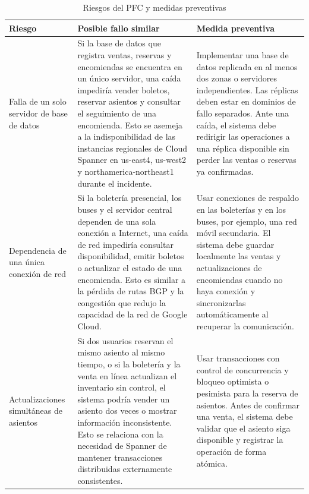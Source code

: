 \documentclass[11pt]{article}
\begin{document}
\begin{table}[H]
\centering
\caption{Riesgos del PFC y medidas preventivas}
\label{tab:riesgos}
\footnotesize
\begin{tabularx}{\textwidth}{p{2.8cm}Xp{4.8cm}}
\usepackage{float}
\hline
\textbf{Riesgo} & \textbf{Posible fallo similar} & \textbf{Medida preventiva} \\
\hline
Falla de un solo servidor de base de datos & Si la base de datos que registra ventas,
reservas y encomiendas se encuentra en un único servidor, una caída impediría vender boletos,
reservar asientos y consultar el seguimiento de una encomienda. Esto se asemeja a la
indisponibilidad de las instancias regionales de Cloud Spanner en us-east4, us-west2 y
northamerica-northeast1 durante el incidente. \cite{googlecloud19009} &
Implementar una base de datos replicada en al menos dos zonas o servidores independientes.
Las réplicas deben estar en dominios de fallo separados. Ante una caída, el sistema debe
redirigir las operaciones a una réplica disponible sin perder las ventas o reservas ya
confirmadas. \\
\hline
Dependencia de una única conexión de red & Si la boletería presencial, los buses y el
servidor central dependen de una sola conexión a Internet, una caída de red impediría
consultar disponibilidad, emitir boletos o actualizar el estado de una encomienda. Esto es
similar a la pérdida de rutas BGP y la congestión que redujo la capacidad de la red de Google
Cloud. \cite{googlecloud19009} &
Usar conexiones de respaldo en las boleterías y en los buses, por ejemplo, una red móvil
secundaria. El sistema debe guardar localmente las ventas y actualizaciones de encomiendas
cuando no haya conexión y sincronizarlas automáticamente al recuperar la comunicación. \\
\hline
Actualizaciones simultáneas de asientos & Si dos usuarios reservan el mismo asiento al mismo
tiempo, o si la boletería y la venta en línea actualizan el inventario sin control, el sistema
podría vender un asiento dos veces o mostrar información inconsistente. Esto se relaciona con
la necesidad de Spanner de mantener transacciones distribuidas externamente consistentes.
\cite{corbett2013spanner} &
Usar transacciones con control de concurrencia y bloqueo optimista o pesimista para la
reserva de asientos. Antes de confirmar una venta, el sistema debe validar que el asiento
siga disponible y registrar la operación de forma atómica. \\
\hline
\end{tabularx}
\end{table}
\end{document}
